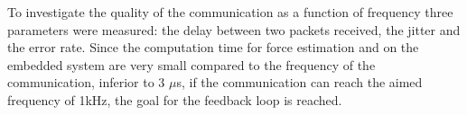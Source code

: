 To investigate the quality of the communication as a function of frequency three parameters were measured: the delay between two packets received, the jitter and the error rate. Since the computation time for force estimation and on the embedded system are very small compared to the frequency of the communication, inferior to 3 $\mu$s, if the communication can reach the aimed frequency of 1kHz, the goal for the feedback loop is reached.










